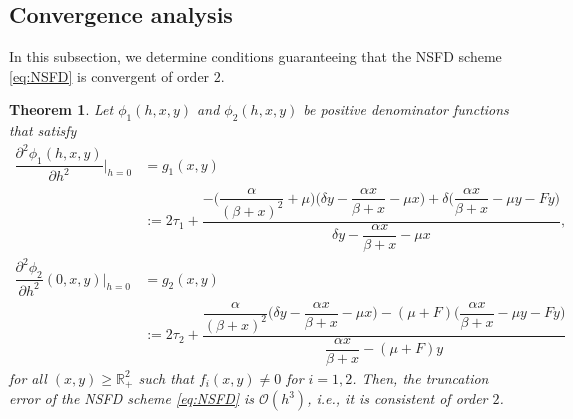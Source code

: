 \documentclass[12pt]{article}
\newtheorem{theorem}{Theorem}[section]
\theoremstyle{definition}
\theoremstyle{remark}
\numberwithin{equation}{section}
\begin{document}
\subsection{Convergence analysis}
In this subsection, we determine conditions guaranteeing that the NSFD scheme \eqref{eq:NSFD} is convergent of order $2$.
\begin{theorem}\label{Theorem4}
Let $\phi_1(h, x, y)$ and $\phi_2(h, x, y)$ be positive denominator functions that satisfy
\begin{equation}\label{eq:2ndNSFD}
\begin{split}
\dfrac{\partial^2 \phi_1(h, x, y)}{\partial h^2}\bigg|_{h = 0} &= g_1(x, y)\\
&:= 2\tau_1 + \dfrac{-\bigg(\dfrac{\alpha}{(\beta + x)^2} + \mu\bigg)\bigg(\delta y- \dfrac{\alpha x}{\beta + x} - \mu x\bigg) + \delta\bigg(\dfrac{\alpha x}{\beta + x} - \mu y - Fy\bigg)}{\delta y - \dfrac{\alpha x}{\beta + x}-\mu x},\\
%
\dfrac{\partial^2 \phi_2}{\partial h^2}(0, x, y)\bigg|_{h = 0}  &= g_2(x, y)\\
&:= 2\tau_2 + \dfrac{\dfrac{\alpha}{(\beta + x)^2}\bigg(\delta y  - \dfrac{\alpha x}{\beta + x} - \mu x\bigg) - (\mu + F)\bigg(\dfrac{\alpha x}{\beta + x} - \mu y - Fy\bigg)}{\dfrac{\alpha x}{\beta + x}-(\mu+F) y}
\end{split}
\end{equation}
for all $(x, y) \geq \mathbb{R}_+^2$ such that $f_i(x, y) \ne 0$ for $i = 1, 2$. Then, the truncation error of the NSFD scheme \eqref{eq:NSFD} is $\mathcal{O}(h^3)$, i.e., it is consistent of order $2$.
\end{theorem}
\end{document}
